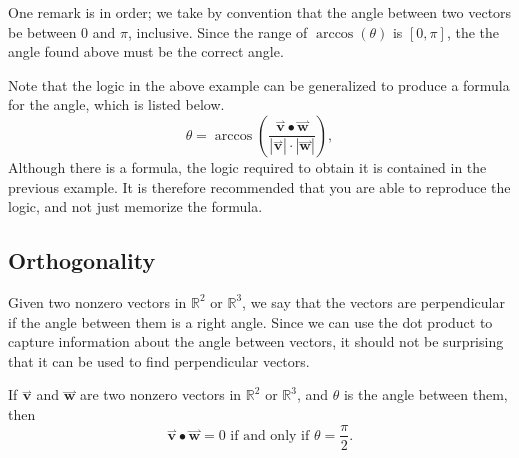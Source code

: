 \documentclass{ximera}
\begin{document}
One remark is in order; we take by convention that the angle between two vectors be between $0$ and $\pi$, inclusive.  Since the range of $\arccos(\theta)$ is $[0,\pi]$, the the angle found above must be the correct angle.

Note that the logic in the above example can be generalized to produce a formula for the angle, which is listed below.
\[
\theta = \arccos\left(\frac{\overset{\boldsymbol{\rightharpoonup}}{\mathbf{v}} \bullet \overset{\boldsymbol{\rightharpoonup}}{\mathbf{w}}
}{|\overset{\boldsymbol{\rightharpoonup}}{\mathbf{v}}|\cdot|\overset{\boldsymbol{\rightharpoonup}}{\mathbf{w}}|}\right),
\]
Although there is a formula, the logic required to obtain it is contained in the previous example.  It is therefore recommended that you are able to reproduce the logic, and not just memorize the formula.

\subsection{Orthogonality}
Given two nonzero vectors in $\mathbb{R}^2$ or $\mathbb{R}^3$, we say that the vectors are perpendicular if the angle between them is a right angle.  Since we can use the dot product to capture information about the angle between vectors, it should not be surprising that it can be used to find perpendicular vectors.

\begin{theorem}
  If $\overset{\boldsymbol{\rightharpoonup}}{\mathbf{v}}$ and $\overset{\boldsymbol{\rightharpoonup}}{\mathbf{w}}$ are two nonzero vectors in $\mathbb{R}^2$ or $\mathbb{R}^3$, and $\theta$ is
  the angle between them, then
  \[
  \overset{\boldsymbol{\rightharpoonup}}{\mathbf{v}} \bullet \overset{\boldsymbol{\rightharpoonup}}{\mathbf{w}} = 0 \text{ if and only if } \theta= \frac{\pi}{2}.
  \]
\end{theorem}
\end{document}
